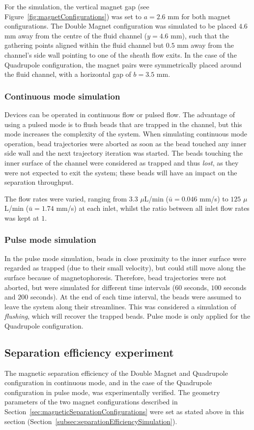 For the simulation, the vertical magnet gap (see Figure~\ref{fig:magnetConfigurations}) was set to $a=2.6$ mm for both magnet configurations. The Double Magnet configuration was simulated to be placed $4.6$ mm away from the centre of the fluid channel ($y=4.6$ mm), such that the gathering points aligned within the fluid channel but $0.5$ mm away from the channel's side wall pointing to one of the sheath flow exits. In the case of the Quadrupole configuration, the magnet pairs were symmetrically placed around the fluid channel, with a horizontal gap of $b=3.5$ mm.

\subsubsection{Continuous mode simulation}\label{subsubsec:continuousModeSimulation}
Devices can be operated in continuous flow or pulsed flow. The advantage of using a pulsed mode is to flush beads that are trapped in the channel, but this mode increases the complexity of the system. When simulating continuous mode operation, bead trajectories were aborted as soon as the bead touched any inner side wall and the next trajectory iteration was started. The beads touching the inner surface of the channel were considered as trapped and thus \textit{lost}, as they were not expected to exit the system; these beads will have an impact on the separation throughput.

The flow rates were varied, ranging from $3.3$ $\mu$L/min ($\bar{u}=0.046$ mm/s) to $125$ $\mu$L/min ($\bar{u}=1.74$ mm/s) at each inlet, whilst the ratio between all inlet flow rates was kept at $1$.

\subsubsection{Pulse mode simulation}\label{subsubsec:pulseModeSimulation}
In the pulse mode simulation, beads in close proximity to the inner surface were regarded as trapped (due to their small velocity), but could still move along the surface because of magnetophoresis. Therefore, bead trajectories were not aborted, but were simulated for different time intervals ($60$ seconds, $100$ seconds and $200$ seconds). At the end of each time interval, the beads were assumed to leave the system along their streamlines. This was considered a simulation of \textit{flushing}, which will recover the trapped beads. Pulse mode is only applied for the Quadrupole configuration.

\subsection{Separation efficiency experiment}\label{subsec:separationEfficiencyExperiment}
The magnetic separation efficiency of the Double Magnet and Quadrupole configuration in continuous mode, and in the case of the Quadrupole configuration in pulse mode, was experimentally verified. The geometry parameters of the two magnet configurations described in Section~\ref{sec:magneticSeparationConfigurations} were set as stated above in this section (Section~\ref{subsec:separationEfficiencySimulation}).

